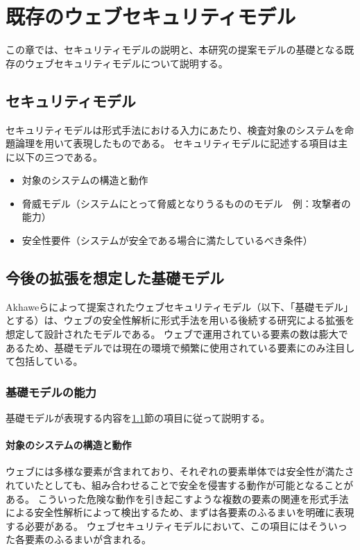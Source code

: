 \documentclass[12pt,a4paper]{jbook}
\begin{document}
\chapter{既存のウェブセキュリティモデル}
\label{sec:existing-model}
この章では、セキュリティモデルの説明と、本研究の提案モデルの基礎となる既存のウェブセキュリティモデルについて説明する。

\section{セキュリティモデル}
\label{sec:SecurityModel}
セキュリティモデルは形式手法における入力にあたり、検査対象のシステムを命題論理を用いて表現したものである。
セキュリティモデルに記述する項目は主に以下の三つである\cite{security_modeling_and_analysis}。
\begin{itemize}
\item 対象のシステムの構造と動作
\item 脅威モデル（システムにとって脅威となりうるもののモデル　例：攻撃者の能力）
\item 安全性要件（システムが安全である場合に満たしているべき条件）
\end{itemize}

\section{今後の拡張を想定した基礎モデル}
\label{sec:based-model}
Akhaweらによって提案されたウェブセキュリティモデル\cite{based-model}（以下、「基礎モデル」とする）は、ウェブの安全性解析に形式手法を用いる後続する研究による拡張を想定して設計されたモデルである。
ウェブで運用されている要素の数は膨大であるため、基礎モデルでは現在の環境で頻繁に使用されている要素にのみ注目して包括している。

\subsection{基礎モデルの能力}
\label{sec:based-model-power}
基礎モデルが表現する内容を\ref{sec:SecurityModel}節の項目に従って説明する。

\subsubsection{対象のシステムの構造と動作}
ウェブには多様な要素が含まれており、それぞれの要素単体では安全性が満たされていたとしても、組み合わせることで安全を侵害する動作が可能となることがある。
こういった危険な動作を引き起こすような複数の要素の関連を形式手法による安全性解析によって検出するため、まずは各要素のふるまいを明確に表現する必要がある。
ウェブセキュリティモデルにおいて、この項目にはそういった各要素のふるまいが含まれる。
\end{document}
